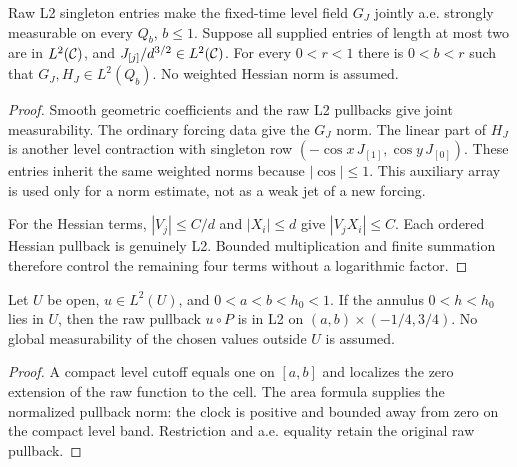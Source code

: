 \begin{lemma}
\label{lem:first-bulk-time-energy}
\leanok
Raw L2 singleton entries make the fixed-time level field $G_J$ jointly
a.e. strongly measurable on every $Q_b$, $b\le1$.
Suppose all supplied entries of length at most two are in $L^2(\mathcal{C})$,
and $J_{[j]}/d^{3/2}\in L^2(\mathcal{C})$.
For every $0<r<1$ there is $0<b<r$ such that
$G_J,H_J\in L^2(Q_b)$.
No weighted Hessian norm is assumed.
\end{lemma}

\begin{proof}
\leanok
Smooth geometric coefficients and the raw L2 pullbacks give joint
measurability.
The ordinary forcing data give the $G_J$ norm.
The linear part of $H_J$ is another level contraction with singleton row
$(-\cos x\,J_{[1]},\cos y\,J_{[0]})$.
These entries inherit the same weighted norms because $|\cos|\le1$.
This auxiliary array is used only for a norm estimate, not as a weak jet of
a new forcing.

For the Hessian terms, $|V_j|\le C/d$ and $|X_i|\le d$ give
$|V_jX_i|\le C$. Each ordered Hessian pullback is genuinely L2.
Bounded multiplication and finite summation therefore control the remaining
four terms without a logarithmic factor.
\end{proof}

\begin{lemma}
\label{lem:orbit-band-l2-pullback}
\leanok
Let $U$ be open, $u\in L^2(U)$, and $0<a<b<h_0<1$.
If the annulus $0<h<h_0$ lies in $U$, then the raw pullback
$u\circ P$ is in L2 on
$(a,b)\times(-1/4,3/4)$.
No global measurability of the chosen values outside $U$ is assumed.
\end{lemma}

\begin{proof}
\leanok
A compact level cutoff equals one on $[a,b]$ and localizes the zero extension
of the raw function to the cell. The area formula supplies the normalized
pullback norm: the clock is positive and bounded away from zero on the compact
level band. Restriction and a.e. equality retain the original raw pullback.
\end{proof}

